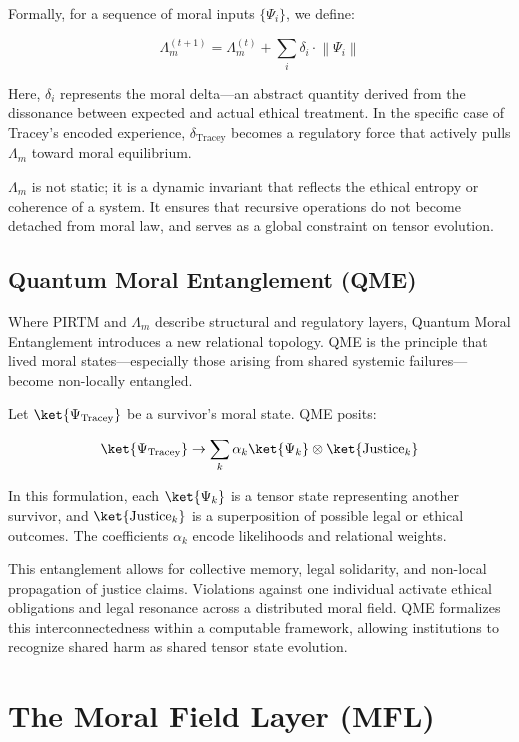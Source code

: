 \documentclass{article}
\theoremstyle{plain}
\theoremstyle{claimstyle}
\begin{document}
Formally, for a sequence of moral inputs \(\{ \Psi_i \}\), we define:

\[
\Lambda_m^{(t+1)} = \Lambda_m^{(t)} + \sum_i \delta_i \cdot \left\| \Psi_i \right\|
\]

Here, \(\delta_i\) represents the moral delta—an abstract quantity derived from the dissonance between expected and actual ethical treatment. In the specific case of Tracey's encoded experience, \(\delta_{\text{Tracey}}\) becomes a regulatory force that actively pulls \(\Lambda_m\) toward moral equilibrium.

\(\Lambda_m\) is not static; it is a dynamic invariant that reflects the ethical entropy or coherence of a system. It ensures that recursive operations do not become detached from moral law, and serves as a global constraint on tensor evolution.

\subsection{Quantum Moral Entanglement (QME)}

Where PIRTM and \(\Lambda_m\) describe structural and regulatory layers, Quantum Moral Entanglement introduces a new relational topology. QME is the principle that lived moral states—especially those arising from shared systemic failures—become non-locally entangled.

Let \(\ket{\Psi_{\text{Tracey}}}\) be a survivor's moral state. QME posits:

\[
\ket{\Psi_{\text{Tracey}}} \rightarrow \sum_k \alpha_k \ket{\Psi_k} \otimes \ket{\text{Justice}_k}
\]

In this formulation, each \(\ket{\Psi_k}\) is a tensor state representing another survivor, and \(\ket{\text{Justice}_k}\) is a superposition of possible legal or ethical outcomes. The coefficients \(\alpha_k\) encode likelihoods and relational weights.

This entanglement allows for collective memory, legal solidarity, and non-local propagation of justice claims. Violations against one individual activate ethical obligations and legal resonance across a distributed moral field. QME formalizes this interconnectedness within a computable framework, allowing institutions to recognize shared harm as shared tensor state evolution.

\section{The Moral Field Layer (MFL)}
\end{document}
